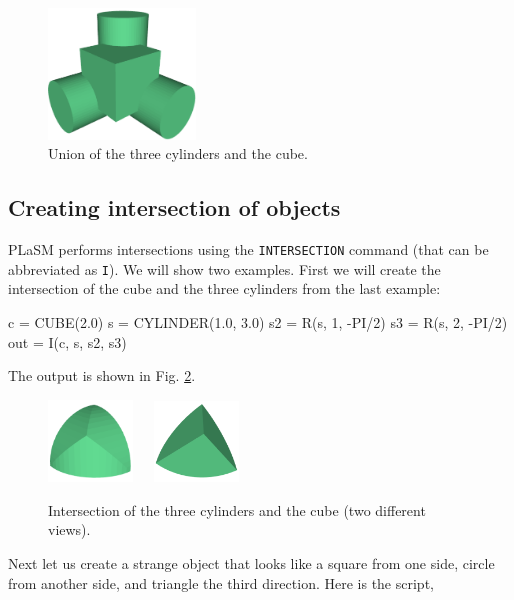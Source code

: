 \begin{figure}[!ht]
\begin{center}
\includegraphics[width=0.35\textwidth]{img/diff-3.png}
\end{center}
\vspace{-4mm}
\caption{Union of the three cylinders and the cube.}
\label{fig:union}
\end{figure}


\subsection{Creating intersection of objects}\label{subsec:intersection}

PLaSM performs intersections using the {\tt INTERSECTION} command (that can be 
abbreviated as {\tt I}). We will show two examples. First we will create the 
intersection of the cube and the three cylinders from the last example:
 
\begin{bluecode}
c = CUBE(2.0)
s = CYLINDER(1.0, 3.0)
s2 = R(s, 1, -PI/2)
s3 = R(s, 2, -PI/2)
out = I(c, s, s2, s3) 
\end{bluecode}
\noindent
The output is shown in Fig. \ref{fig:int-2}.


\begin{figure}[!ht]
\begin{center}
\includegraphics[width=0.2\textwidth]{img/int-2a.png}\ \ \ 
\includegraphics[width=0.2\textwidth]{img/int-2b.png}
\end{center}
\vspace{-4mm}
\caption{Intersection of the three cylinders and the cube (two different views).}
\label{fig:int-2}
\end{figure}
\noindent
Next let us create 
a strange object that looks like a square from one side,
circle from another side, and triangle the third direction. 
Here is the script,

